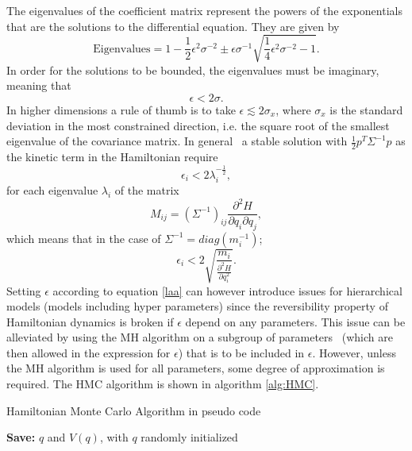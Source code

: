 The eigenvalues of the coefficient matrix represent the powers of the exponentials that are the solutions to the differential equation. They are given by
\begin{equation}
	\text{Eigenvalues}=1-\frac{1}{2}\epsilon^2\sigma^{-2}\pm \epsilon\sigma^{-1}\sqrt{\frac{1}{4}\epsilon^2\sigma^{-2}-1}.
\end{equation}
In order for the solutions to be bounded, the eigenvalues must be imaginary, meaning that
\begin{equation}
	\epsilon<2 \sigma.
	\label{gh}
\end{equation}
In higher dimensions a rule of thumb is to take $\epsilon\lesssim 2\sigma_x$, where $\sigma_x$ is the standard deviation in the most constrained direction, i.e. the square root of the smallest eigenvalue of the covariance matrix. In general~\citep{Betancourt2013} a stable solution with $\frac{1}{2}p^T\Sigma^{-1}p$ as the kinetic term in the Hamiltonian require 
\begin{equation}
	\epsilon_i<2 \lambda_i^{-\frac{1}{2}},
	\label{laa}
\end{equation}
for each eigenvalue $\lambda_i$ of the matrix
\begin{equation}
	M_{ij}=(\Sigma^{-1})_{ij}\frac{\partial^2 H}{\partial q_i\partial q_j},
\end{equation}
which means that in the case of $\Sigma^{-1}=diag(m_i^{-1})$;
\begin{equation}
	\epsilon_i<2\sqrt{\frac{m_i}{\frac{\partial^2H}{\partial q^2_i}}}.
	\label{heu}
\end{equation}
Setting $\epsilon$ according to equation \eqref{laa} can however introduce issues for hierarchical models (models including hyper parameters) since the reversibility property of Hamiltonian dynamics is broken if $\epsilon$ depend on any parameters. This issue can be alleviated by using the MH algorithm on a subgroup of parameters~\citep{Neal:1996,Neal2012} (which are then allowed in the expression for $\epsilon$) that is to be included in $\epsilon$. However, unless the MH algorithm is used for all parameters, some degree of approximation is required. The HMC algorithm is shown in algorithm \ref{alg:HMC}.
\vspace{5mm} %

\begin{algorithm}
	\label{alg:HMC}
	\caption{Hamiltonian Monte Carlo Algorithm in pseudo code}
	\textbf{Save:} $q$ and $V(q)$, with $q$ randomly initialized\;
\end{algorithm}
\vspace{5mm} %